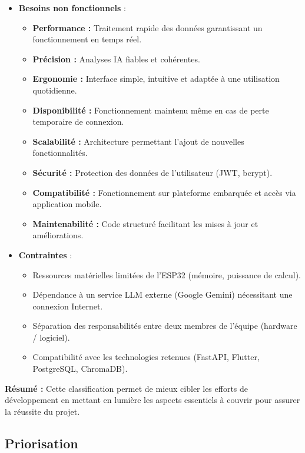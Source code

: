 \documentclass[12pt,a4paper]{report}
\begin{document}
\begin{itemize}
    \item \textbf{Besoins non fonctionnels} :
    \begin{itemize}
        \item \textbf{Performance :} Traitement rapide des données garantissant un fonctionnement en temps réel.
        \item \textbf{Précision :} Analyses IA fiables et cohérentes.
        \item \textbf{Ergonomie :} Interface simple, intuitive et adaptée à une utilisation quotidienne.
        \item \textbf{Disponibilité :} Fonctionnement maintenu même en cas de perte temporaire de connexion.
        \item \textbf{Scalabilité :} Architecture permettant l'ajout de nouvelles fonctionnalités.
        \item \textbf{Sécurité :} Protection des données de l'utilisateur (\ac{JWT}, bcrypt).
        \item \textbf{Compatibilité :} Fonctionnement sur plateforme embarquée et accès via application mobile.
        \item \textbf{Maintenabilité :} Code structuré facilitant les mises à jour et améliorations.
    \end{itemize}

    \item \textbf{Contraintes} :
    \begin{itemize}
        \item Ressources matérielles limitées de l'ESP32 (mémoire, puissance de calcul).
        \item Dépendance à un service \ac{LLM} externe (Google Gemini) nécessitant une connexion Internet.
        \item Séparation des responsabilités entre deux membres de l'équipe (hardware / logiciel).
        \item Compatibilité avec les technologies retenues (FastAPI, Flutter, PostgreSQL, ChromaDB).
    \end{itemize}
\end{itemize}

\vspace{1em}
\noindent\colorbox{gray!15}{%
    \parbox{\dimexpr\linewidth-2\fboxsep}{%
        \textbf{Résumé :} Cette classification permet de mieux cibler les efforts de développement en mettant en lumière les aspects essentiels à couvrir pour assurer la réussite du projet.
    }%
}

\subsection{Priorisation}
\end{document}
